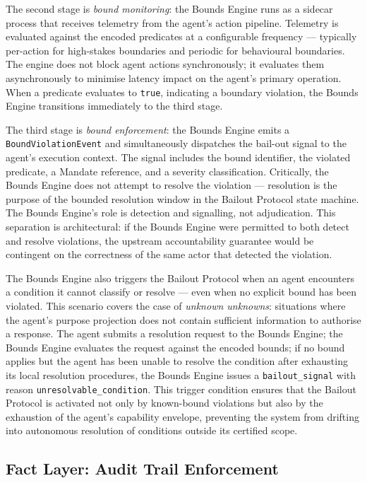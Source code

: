 The second stage is \emph{bound monitoring}: the Bounds Engine runs as a sidecar process that receives telemetry from the agent's action pipeline. Telemetry is evaluated against the encoded predicates at a configurable frequency — typically per-action for high-stakes boundaries and periodic for behavioural boundaries. The engine does not block agent actions synchronously; it evaluates them asynchronously to minimise latency impact on the agent's primary operation. When a predicate evaluates to \texttt{true}, indicating a boundary violation, the Bounds Engine transitions immediately to the third stage.

The third stage is \emph{bound enforcement}: the Bounds Engine emits a \texttt{BoundViolationEvent} and simultaneously dispatches the bail-out signal to the agent's execution context. The signal includes the bound identifier, the violated predicate, a Mandate reference, and a severity classification. Critically, the Bounds Engine does not attempt to resolve the violation — resolution is the purpose of the bounded resolution window in the Bailout Protocol state machine. The Bounds Engine's role is detection and signalling, not adjudication. This separation is architectural: if the Bounds Engine were permitted to both detect and resolve violations, the upstream accountability guarantee would be contingent on the correctness of the same actor that detected the violation.

The Bounds Engine also triggers the Bailout Protocol when an agent encounters a condition it cannot classify or resolve — even when no explicit bound has been violated. This scenario covers the case of \emph{unknown unknowns}: situations where the agent's purpose projection does not contain sufficient information to authorise a response. The agent submits a resolution request to the Bounds Engine; the Bounds Engine evaluates the request against the encoded bounds; if no bound applies but the agent has been unable to resolve the condition after exhausting its local resolution procedures, the Bounds Engine issues a \texttt{bailout\_signal} with reason \texttt{unresolvable\_condition}. This trigger condition ensures that the Bailout Protocol is activated not only by known-bound violations but also by the exhaustion of the agent's capability envelope, preventing the system from drifting into autonomous resolution of conditions outside its certified scope.

\subsection{Fact Layer: Audit Trail Enforcement}
\label{sec:fact-layer-enforcement}


